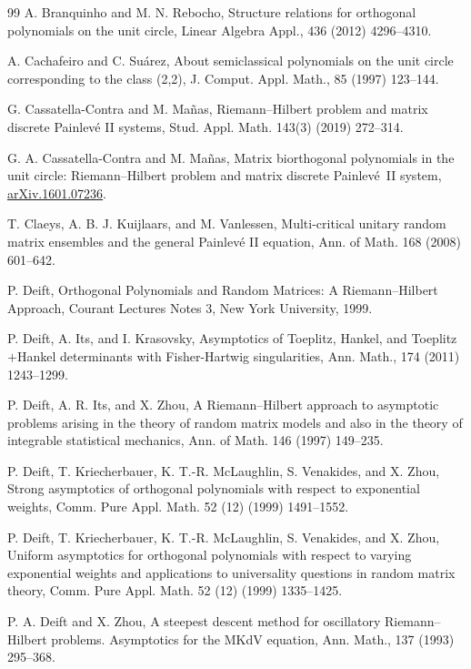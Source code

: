 \documentclass[12pt]{amsart}
\begin{document}
\begin{thebibliography}{99}
A. Branquinho and M. N. Rebocho,
Structure relations for orthogonal polynomials on the unit circle, 
Linear Algebra Appl., 436 (2012) 4296--4310. 


A. Cachafeiro and C. Su\'arez,
About semiclassical polynomials on the unit circle corresponding to the class (2,2),
J. Comput. Appl. Math., 85 (1997) 123--144.

G. Cassatella-Contra and M. Ma\~nas,
Riemann--Hilbert problem and matrix discrete Painlev\'e II systems,
Stud. Appl. Math. 143(3) (2019) 272--314.




G. A. Cassatella-Contra and M. Ma\~nas,
Matrix biorthogonal polynomials in the unit circle: 
Riemann--Hilbert problem and matrix discrete Painlev\'e~II system,
\href{https://doi.org/10.48550/arXiv.1601.07236}{arXiv.1601.07236}.



T. Claeys, A. B. J. Kuijlaars, and M. Vanlessen,
Multi-critical unitary random matrix ensembles and the general Painlev\'e II equation,
Ann. of Math. 168 (2008) 601--642.


P. Deift, 
Orthogonal Polynomials and Random Matrices:
A Riemann--Hilbert Approach, 
Courant Lectures Notes 3, New York University, 1999.



P. Deift, A. Its, and I. Krasovsky,
Asymptotics of Toeplitz, Hankel, and Toeplitz$+$Hankel determinants with Fisher-Hartwig singularities,
Ann. Math., 174 (2011) 1243--1299.


P. Deift, A. R. Its, and X. Zhou,
A Riemann--Hilbert approach to asymptotic problems arising in the theory of random matrix models and also in the theory of integrable statistical mechanics,
Ann. of Math. 146 (1997) 149--235.


P. Deift, T. Kriecherbauer, K. T.-R. McLaughlin, S. Venakides, and X. Zhou, 
Strong asymptotics of orthogonal polynomials with respect to exponential weights,
Comm. Pure Appl. Math. 52 (12) (1999) 1491--1552.


P. Deift, T. Kriecherbauer, K. T.-R. McLaughlin, S. Venakides, and X. Zhou, 
Uniform asymptotics for orthogonal polynomials with respect to varying exponential weights and applications to universality questions in random matrix theory, 
Comm. Pure Appl. Math. 52 (12) (1999) 1335--1425.


P. A. Deift and X. Zhou, 
A steepest descent method for oscillatory Riemann--Hilbert problems.
Asymptotics for the MKdV equation, Ann. Math., 137 (1993) 295--368.



\end{thebibliography}
\end{document}
